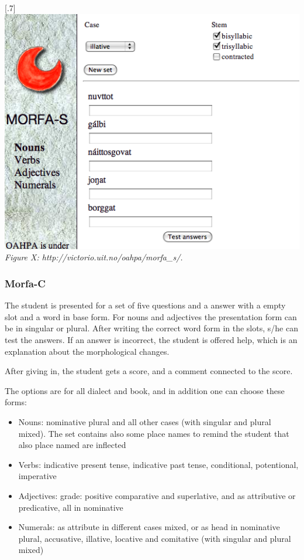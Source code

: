 \documentclass[a4paper,12pt]{article}
\begin{document}
\scalebox{.7}[.7]{\includegraphics{img/morfaS.png}}\\
\textit{Figure X: http://victorio.uit.no/oahpa/morfa\_s/.} 


\subsubsection{Morfa-C}
The student is presented for a set of five questions and a answer with a empty slot and a word in base form. For nouns and adjectives the presentation form can be in singular or plural. After writing the correct word form in the slots, s/he can test the answers. If an answer is incorrect, the student is offered help, which is an explanation about the morphological changes.

After giving in, the student gets a score, and a comment connected to the score. 

The options are for all dialect and book, and in addition one can choose these forms:
\begin{itemize}
\item Nouns: nominative plural and all other cases (with singular and plural mixed). The set contains also some place names to remind the student that also place named are inflected
\item Verbs: indicative present tense, indicative past tense, conditional, potentional, imperative
\item Adjectives: grade: positive comparative and superlative, and as attributive or predicative, all in nominative
\item Numerals: as attribute in different cases mixed, or as head in nominative plural, accusative, illative, locative and comitative (with singular and plural mixed)
\end{itemize}
\vspace{0.5cm}
\end{document}
